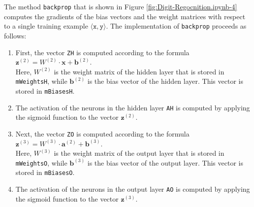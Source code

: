 The method \texttt{backprop} that is shown in Figure \ref{fig:Digit-Regocnition.ipynb-4} computes the gradients
of the bias vectors and the weight matrices with respect to 
a single training example $\langle \texttt{x}, \texttt{y} \rangle$.  The implementation of \texttt{backprop}
proceeds as follows:
\begin{enumerate}
\item First, the vector \texttt{ZH} is computed according to the formula
      \\[0.2cm]
      \hspace*{1.3cm}
      $\mathbf{z}^{(2)} = W^{(2)} \cdot \mathbf{x} + \mathbf{b}^{(2)}$.
      \\[0.2cm]
      Here, $W^{(2)}$ is the weight matrix of the hidden layer that is stored in \texttt{mWeightsH}, while
      $\mathbf{b}^{(2)}$ is the bias vector of the hidden layer.  This vector is stored in \texttt{mBiasesH}.
\item The activation of the neurons in the hidden layer \texttt{AH} is computed by applying the sigmoid
      function to the vector $\mathbf{z}^{(2)}$.
\item Next, the vector \texttt{ZO} is computed according to the formula
      \\[0.2cm]
      \hspace*{1.3cm}
      $\mathbf{z}^{(3)} = W^{(3)} \cdot \mathbf{a}^{(2)} + \mathbf{b}^{(3)}$.
      \\[0.2cm]
      Here, $W^{(3)}$ is the weight matrix of the output layer that is stored in \texttt{mWeightsO}, while
      $\mathbf{b}^{(3)}$ is the bias vector of the output layer.  This vector is stored in \texttt{mBiasesO}.
\item The activation of the neurons in the output layer \texttt{AO} is computed by applying the sigmoid
      function to the vector $\mathbf{z}^{(3)}$.


\end{enumerate}
